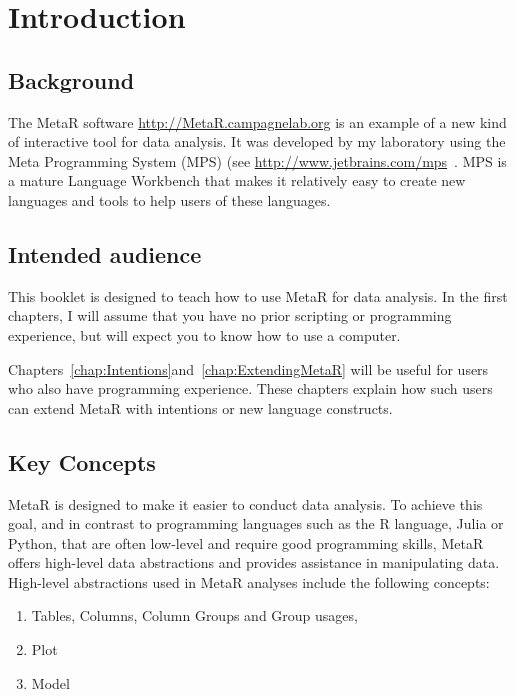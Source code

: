 


\chapter{Introduction}\label{chap:Introduction}
\section{Background}
The MetaR software \url{http://MetaR.campagnelab.org} is an example of a new kind of interactive tool for data analysis. It was developed by my laboratory using the Meta Programming System (MPS) (see \url{http://www.jetbrains.com/mps}~\cite{Dmitriev:2004,campagne2014mps}. MPS is a mature Language Workbench that makes it relatively easy to create new languages and tools to help users of these languages. 

\section{Intended audience}
This booklet is designed to teach how to use MetaR for data analysis. In the first chapters, I will assume that you have no prior scripting or programming experience, but will expect you to know how to use a computer.

Chapters~\ref{chap:Intentions}and~\ref{chap:ExtendingMetaR} will be useful for users who also have programming experience. These chapters explain how such users can extend MetaR with intentions or new language constructs.

\section{Key Concepts}
MetaR is designed to make it easier to conduct data analysis. To achieve this goal, and in contrast to programming languages such as the R language, Julia or Python, that are often low-level and require good programming skills, MetaR offers high-level data abstractions and provides assistance in manipulating data. High-level abstractions used in MetaR analyses include the following concepts:

\begin{enumerate}
	\item Tables, Columns, Column Groups and Group usages,
	\item Plot
	\item Model
\end{enumerate}

